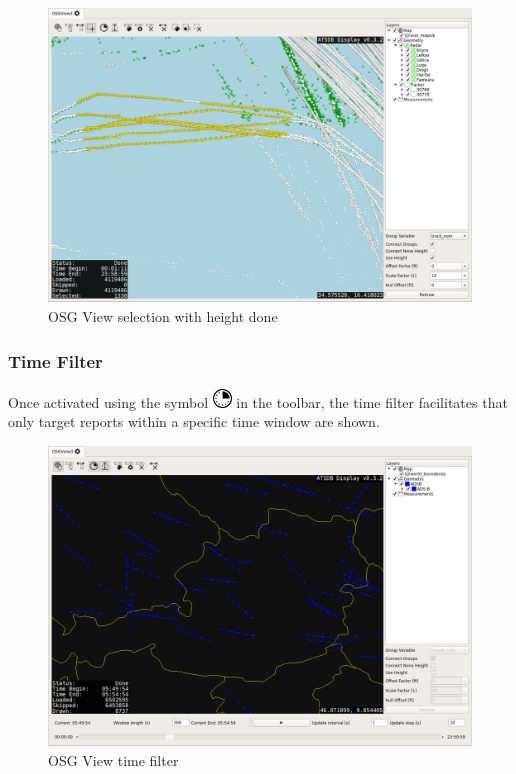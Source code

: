 \begin{figure}[H]
    \hspace*{-2cm}
    \includegraphics[width=18cm,frame]{../screenshots/osgview_select3d_2.png}
  \caption{OSG View selection with height done}
\end{figure}


\subsubsection{Time Filter}

Once activated using the symbol \includegraphics[width=0.5cm,frame]{../../data/icons/time.png} in the toolbar, the time filter facilitates that only target reports within a specific time window are shown.


\begin{figure}[H]
    \hspace*{-2cm}
    \includegraphics[width=18cm,frame]{../screenshots/osgview_time_filter.png}
  \caption{OSG View time filter}
  \label{fig:osgview_time_filter}
\end{figure}

